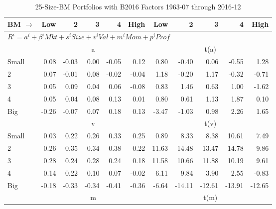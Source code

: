 
\begin{table}[!ht]
\centering
\caption{25-Size-BM Portfolios with B2016 Factors 1963-07 through 2016-12}
\begin{tabular}{lrrrrrrrrrr}
  \toprule
    BM $\rightarrow$ & Low & 2 & 3 & 4 & High & Low & 2 & 3 & 4 & High \\ 
  \midrule
  \multicolumn{11}{l}{$R^i=a^i+\beta^iMkt+s^iSize+v^iVal+m^iMom+p^iProf$} \\

  
    
      & \multicolumn{5}{c}{a} & \multicolumn{5}{c}{t(a)}
    
    \\
      \cmidrule(r){2-6} \cmidrule(r){7-11}

    Small   & 0.08  & -0.03  & 0.00  & -0.05  & 0.12  & 0.80  & -0.40  & 0.06  & -0.55  & 1.28  \\
         2  & 0.07  & -0.01  & 0.08  & -0.02  & -0.04  & 1.18  & -0.20  & 1.17  & -0.32  & -0.71  \\
         3  & 0.05  & 0.09  & 0.04  & 0.06  & -0.08  & 0.83  & 1.46  & 0.63  & 1.00  & -1.62  \\
         4  & 0.05  & 0.04  & 0.08  & 0.13  & 0.01  & 0.80  & 0.61  & 1.13  & 1.87  & 0.10  \\
    Big     & -0.26  & -0.07  & 0.07  & 0.18  & 0.13  & -3.47  & -1.03  & 0.98  & 2.26  & 1.65  \\

  
    
      & \multicolumn{5}{c}{v} & \multicolumn{5}{c}{t(v)}
    
    \\
      \cmidrule(r){2-6} \cmidrule(r){7-11}

    Small   & 0.03  & 0.22  & 0.26  & 0.33  & 0.25  & 0.89  & 8.33  & 8.38  & 10.61  & 7.49  \\
         2  & 0.26  & 0.35  & 0.34  & 0.38  & 0.22  & 11.63  & 14.48  & 13.47  & 14.78  & 9.86  \\
         3  & 0.28  & 0.24  & 0.28  & 0.24  & 0.18  & 11.58  & 10.66  & 11.88  & 10.19  & 9.61  \\
         4  & 0.14  & 0.22  & 0.10  & 0.07  & -0.02  & 6.11  & 9.84  & 3.90  & 2.55  & -0.83  \\
    Big     & -0.18  & -0.33  & -0.34  & -0.41  & -0.36  & -6.64  & -14.11  & -12.61  & -13.91  & -12.65  \\

  
    
      & \multicolumn{5}{c}{m} & \multicolumn{5}{c}{t(m)}
    

\end{tabular}
\end{table}

